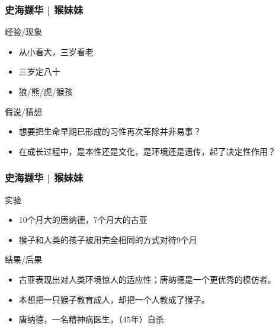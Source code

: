 \begin{frame}
  \frametitle{史海撷华 | 猴妹妹}
  \begin{block}{经验/现象}
    \begin{itemize}
      \item 从小看大，三岁看老
      \item 三岁定八十
      \item 狼/熊/虎/猴孩
    \end{itemize}
  \end{block}
  \pause
  \begin{block}{假说/猜想}
    \begin{itemize}
      \item 想要把生命早期已形成的习性再次革除并非易事？
      \item 在成长过程中，是本性还是文化，是环境还是遗传，起了决定性作用？
    \end{itemize}
  \end{block}
\end{frame}

\begin{frame}
  \frametitle{史海撷华 | 猴妹妹}
  \begin{block}{实验}
    \begin{itemize}
      \item 10个月大的唐纳德，7个月大的古亚
      \item 猴子和人类的孩子被用完全相同的方式对待9个月
    \end{itemize}
  \end{block}
  \pause
  \begin{block}{结果/后果}
    \begin{itemize}
      \item 古亚表现出对人类环境惊人的适应性；唐纳德是一个更优秀的模仿者。
      \item 本想把一只猴子教育成人，却把一个人教成了猴子。
      \item 唐纳德，一名精神病医生，（45年）自杀
    \end{itemize}
  \end{block}
\end{frame}

